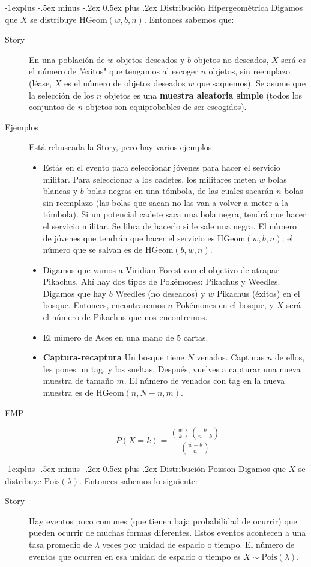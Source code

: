 \documentclass[12,landscape]{article}
\makeatletter
\newcommand{\Pois}{\textrm{Pois}}
\newcommand{\Hypergeometric}{\textrm{HGeom}}
\newcommand{\HGeom}{\textrm{HGeom}}
\renewcommand{\subsection}{\@startsection{subsection}{2}{0mm}%
                                {-1explus -.5ex minus -.2ex}%
                                {0.5ex plus .2ex}%
                                {\normalfont\normalsize\bfseries}}
\makeatother
\begin{document}
\begin{multicols*}{3}
\subsection{Distribución Hípergeométrica} Digamos que $X$ se distribuye $\Hypergeometric(w, b, n)$. Entonces sabemos que:
\begin{description}
    \item[Story] En una población de $w$ objetos deseados y $b$ objetos no deseados, $X$ será es el número de "éxitos" que tengamos al escoger $n$ objetos, sin reemplazo (léase, $X$ es el número de objetos deseados $w$ que saquemos). Se asume que la selección de los $n$ objetos es una \textbf{muestra aleatoria simple} (todos los conjuntos de $n$ objetos son equiprobables de ser escogidos).
    \item[Ejemplos] Está rebuscada la Story, pero hay varios ejemplos:
    \begin{itemize}
    \item Estás en el evento para seleccionar jóvenes para hacer el servicio militar. Para seleccionar a los cadetes, los militares meten $w$ bolas blancas y $b$ bolas negras en una tómbola, de las cuales sacarán $n$ bolas sin reemplazo (las bolas que sacan no las van a volver a meter a la tómbola). Si un potencial cadete saca una bola negra, tendrá que hacer el servicio militar. Se libra de hacerlo si le sale una negra. El número de jóvenes que tendrán que hacer el servicio es $\HGeom(w,b,n)$; el número que se salvan es de $\HGeom(b,w,n)$.
    \item Digamos que vamos a Viridian Forest con el objetivo de atrapar Pikachus. Ahí hay dos tipos de Pokémones: Pikachus y Weedles. Digamos que hay $b$ Weedles (no deseados) y $w$ Pikachus (éxitos) en el bosque. Entonces, encontraremos $n$ Pokémones en el bosque, y $X$ será el número de Pikachus que nos encontremos.
    \item El número de Aces en una mano de $5$ cartas.
    \item \textbf{Captura-recaptura} Un bosque tiene $N$ venados. Capturas $n$ de ellos, les pones un tag, y los sueltas. Después, vuelves a capturar una nueva muestra de tamaño $m$. El número de venados con tag en la nueva muestra es de $\HGeom(n,N-n,m)$.
    \end{itemize} 
    \item[FMP]
    \[P(X = k) = \frac{{w \choose k}{b \choose n-k}}{{w + b \choose n}}\]
\end{description}

\subsection{Distribución Poisson} Digamos que $X$ se distribuye $\Pois(\lambda)$. Entonces sabemos lo siguiente:
\begin{description}
    \item[Story] Hay eventos poco comunes (que tienen baja probabilidad de ocurrir) que pueden ocurrir de muchas formas diferentes. Estos eventos acontecen a una tasa promedio de $\lambda$ veces por unidad de espacio o tiempo. El número de eventos que ocurren en esa unidad de espacio o tiempo es $X \sim \Pois(\lambda)$.


\end{description}
\end{multicols*}
\end{document}
